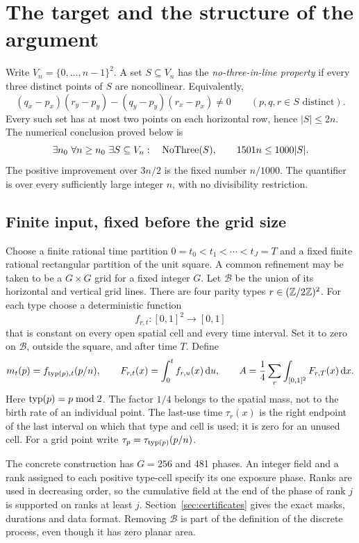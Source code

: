 \section{The target and the structure of the argument}\label{sec:overview}

Write \(V_n=\{0,\ldots,n-1\}^2\). A set \(S\subseteq V_n\) has the
\emph{no-three-in-line property} if every three distinct points of \(S\)
are noncollinear. Equivalently,
\[
 (q_x-p_x)(r_y-p_y)-(q_y-p_y)(r_x-p_x)\ne0
 \qquad(p,q,r\in S\text{ distinct}).
\]
Every such set has at most two points on each horizontal row, hence
\(|S|\le2n\). The numerical conclusion proved below is
\begin{equation}\label{eq:target}
 \exists n_0\ \forall n\ge n_0\ \exists S\subseteq V_n:
 \quad \operatorname{NoThree}(S),\qquad 1501n\le1000|S|.
\end{equation}
The positive improvement over \(3n/2\) is the fixed number \(n/1000\).
The quantifier is over every sufficiently large integer \(n\), with no
divisibility restriction.

\subsection{Finite input, fixed before the grid size}
Choose a finite rational time partition
\(0=t_0<t_1<\cdots<t_J=T\) and a fixed finite rational rectangular
partition of the unit square. A common refinement may be taken to be a
\(G\times G\) grid for a fixed integer \(G\). Let \(\mathcal B\) be the
union of its horizontal and vertical grid lines.
There are four parity types \(r\in(\mathbb Z/2\mathbb Z)^2\). For each type choose
a deterministic function
\[
 f_{r,t}:[0,1]^2\longrightarrow[0,1]
\]
that is constant on every open spatial cell and every time interval.
Set it to zero on \(\mathcal B\), outside the square, and after time \(T\).
Define
\begin{equation}\label{eq:input}
 m_t(p)=f_{\operatorname{typ}(p),t}(p/n),\qquad
 F_{r,t}(x)=\int_0^t f_{r,u}(x)\,\mathrm d u,\qquad
 A=\frac14\sum_r\int_{[0,1]^2}F_{r,T}(x)\,\mathrm d x.
\end{equation}
Here \(\operatorname{typ}(p)=p\bmod2\). The factor \(1/4\) belongs to the spatial
mass, not to the birth rate of an individual point.
The last-use time \(\tau_r(x)\) is the right endpoint of the last interval
on which that type and cell is used; it is zero for an unused cell.
For a grid point write \(\tau_p=\tau_{\operatorname{typ}(p)}(p/n)\).

The concrete construction has \(G=256\) and 481 phases. An integer
field and a rank assigned to each positive type-cell specify its one
exposure phase. Ranks are used in decreasing order, so the cumulative
field at the end of the phase of rank \(j\) is supported on ranks
at least \(j\). Section~\ref{sec:certificates} gives the exact masks,
durations and data format. Removing \(\mathcal B\) is part of the
definition of the discrete process, even though it has zero planar area.


